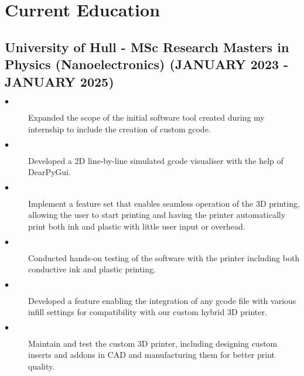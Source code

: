 \documentclass{article}
\begin{document}
\section{Current Education}
\noindent
\begin{minipage}[t]{1\textwidth}
    \subsection{University of Hull \textnormal{- MSc Research Masters in Physics (Nanoelectronics)} \footnotesize{(JANUARY 2023 - JANUARY 2025)}}
    \normalsize{}
    \begin{description}
        \item[$\bullet$]Expanded the scope of the initial software tool created during my internship to include the creation of custom gcode. 
        \item[$\bullet$]Developed a 2D line-by-line simulated gcode visualiser with the help of DearPyGui.
        \item[$\bullet$]Implement a feature set that enables seamless operation of the 3D printing, allowing the user to start printing and having the printer automatically print both ink and plastic with little user input or overhead.
        \item[$\bullet$]Conducted hands-on testing of the software with the printer including both conductive ink and plastic printing.
        \item[$\bullet$]Developed a feature enabling the integration of any gcode file with various infill settings for compatibility with our custom hybrid 3D printer. 
        \item[$\bullet$]Maintain and test the custom 3D printer, including designing custom inserts and addons in CAD and manufacturing them for better print quality.
    \end{description}
\end{minipage}
\end{document}
